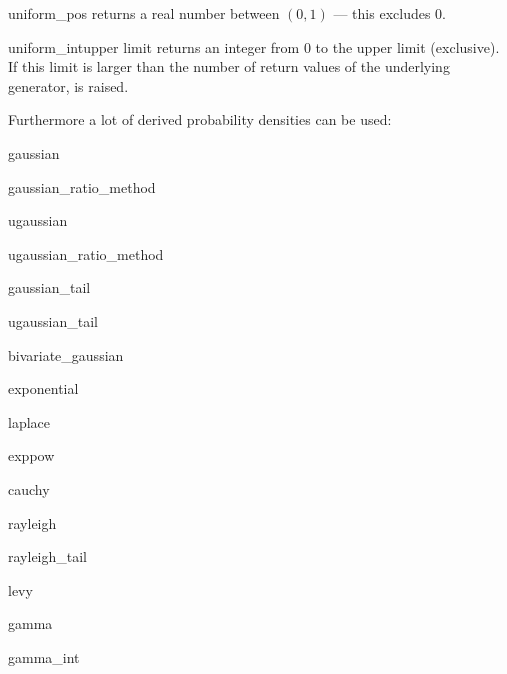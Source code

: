 \begin{methoddesc}{uniform_pos}{}
returns a real number between $(0,1)$ --- this excludes 0.
\end{methoddesc}
\begin{methoddesc}{uniform_int}{upper limit}
returns an integer from 0 to the upper limit (exclusive). If this limit is larger than the
number of return values of the underlying generator,  is raised.
\end{methoddesc}
Furthermore a lot of derived probability densities can be used:
\begin{methoddesc}{gaussian}{}
\end{methoddesc}
\begin{methoddesc}{gaussian\_ratio\_method}{}
\end{methoddesc}
\begin{methoddesc}{ugaussian}{}
\end{methoddesc}
\begin{methoddesc}{ugaussian\_ratio\_method}{}
\end{methoddesc}
\begin{methoddesc}{gaussian\_tail}{}
\end{methoddesc}
\begin{methoddesc}{ugaussian\_tail}{}
\end{methoddesc}
\begin{methoddesc}{bivariate\_gaussian}{}
\end{methoddesc}
\begin{methoddesc}{exponential}{}
\end{methoddesc}
\begin{methoddesc}{laplace}{}
\end{methoddesc}
\begin{methoddesc}{exppow}{}
\end{methoddesc}
\begin{methoddesc}{cauchy}{}
\end{methoddesc}
\begin{methoddesc}{rayleigh}{}
\end{methoddesc}
\begin{methoddesc}{rayleigh\_tail}{}
\end{methoddesc}
\begin{methoddesc}{levy}{}
\end{methoddesc}
\begin{methoddesc}{gamma}{}
\end{methoddesc}
\begin{methoddesc}{gamma\_int}{}
\end{methoddesc}
